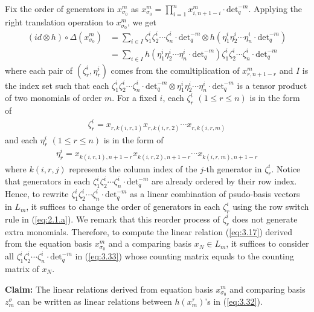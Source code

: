 \documentclass[table,a4paper,reqno]{amsart}
\numberwithin{equation}{section}
\theoremstyle{definition}
\begin{document}
Fix the order of generators in $x_{\sigma_0}^m$ as  $x_{\sigma_0}^m=\prod_{i=1}^nx^{m}_{i,n+1-i}\cdot \text{det}_q^{-m}$. Applying the right translation operation to $x_{\sigma_0}^m$, we get
\begin{equation}\label{eq:3.33}
\begin{split}
    (id\otimes h)\circ\Delta(x_{\sigma_0}^m)&=\sum_{i\in I}\zeta^i_1\zeta^i_2\cdots \zeta^i_n\cdot\text{det}_q^{-m}\otimes h\left(\eta^i_1\eta^i_2\cdots \eta^i_n\cdot\text{det}_q^{-m}\right)\\
    &=\sum_{i\in I}h\left(\eta^i_1\eta^i_2\cdots \eta^i_n\cdot\text{det}_q^{-m}\right)\zeta^i_1\zeta^i_2\cdots \zeta^i_n\cdot\text{det}_q^{-m}
\end{split}
\end{equation}
where each pair of $(\zeta^i_r, \eta^i_r)$ comes from the comultiplication of $x^m_{r,n+1-r}$ and $I$ is the index set such that each $\zeta^i_1\zeta^i_2\cdots \zeta^i_n\cdot\text{det}_q^{-m}\otimes \eta^i_1\eta^i_2\cdots \eta^i_n\cdot\text{det}_q^{-m}$ is a tensor product of two monomials of order $m$. For a fixed $i$, each $\zeta^i_r$ $(1\le r\le n)$ is in the form of
\begin{align}\label{eq:3.34}
    \zeta^i_r=x_{r,k(i,r,1)}x_{r,k(i,r,2)}\cdots x_{r,k(i,r,m)}
\end{align}
and each $\eta^i_r$ $(1\le r\le n)$ is in the form of
\begin{align}
    \eta^i_r=x_{k(i,r,1),n+1-r}x_{k(i,r,2),n+1-r}\cdots x_{k(i,r,m),n+1-r}
\end{align}
where $k(i,r,j)$ represents the column index of the $j$-th generator in $\zeta^i_r$. Notice that generators in each $\zeta^i_1\zeta^i_2\cdots \zeta^i_n\cdot\text{det}_q^{-m}$ are already ordered by their row index. Hence, to rewrite $\zeta^i_1\zeta^i_2\cdots \zeta^i_n\cdot\text{det}_q^{-m}$ as a linear combination of psudo-basis vectors in $L_m$, it suffices to change the order of generators in each $\zeta^i_r$ using the row switch rule in (\ref{eq:2.1.a}). We remark that this reorder process of $\zeta^i_r$ does not generate extra monomials. Therefore, to compute the linear relation (\ref{eq:3.17}) derived from the equation basis $x_{\sigma_0}^m$ and a comparing basis $x_N\in L_m$, it suffices to consider all $\zeta^i_1\zeta^i_2\cdots \zeta^i_n\cdot\text{det}_q^{-m}$ in (\ref{eq:3.33}) whose counting matrix equals to the counting matrix of $x_N$. 

\textbf{Claim:} The linear relations derived from equation basis $x_{\sigma_0}^m$ and comparing basis $z_m^\sigma$ can be written as linear relations between $h(x_m^\tau)$'s in (\ref{eq:3.32}).
\end{document}
